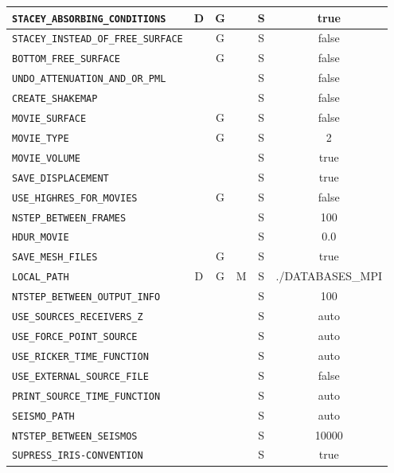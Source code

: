 \begin{longtable}{|p{7.7cm}|c|c|c|c|c|}
		\verb+STACEY_ABSORBING_CONDITIONS+   & D & G &   & S & true \\ \hline
		\verb+STACEY_INSTEAD_OF_FREE_SURFACE+&   & G &   & S & false \\ \hline
		\verb+BOTTOM_FREE_SURFACE+           &   & G &   & S & false \\ \hline
		\verb+UNDO_ATTENUATION_AND_OR_PML+   &   &   &   & S & false \\ \hline
		\verb+CREATE_SHAKEMAP+               &   &   &   & S & false \\ \hline
		\verb+MOVIE_SURFACE+                 &   & G &   & S & false \\ \hline
		\verb+MOVIE_TYPE+                    &   & G &   & S & 2 \\ \hline
		\verb+MOVIE_VOLUME+                  &   &   &   & S & true \\ \hline
		\verb+SAVE_DISPLACEMENT+             &   &   &   & S & true \\ \hline
		\verb+USE_HIGHRES_FOR_MOVIES+        &   & G &   & S & false \\ \hline
		\verb+NSTEP_BETWEEN_FRAMES+          &   &   &   & S & 100 \\ \hline
		\verb+HDUR_MOVIE+                    &   &   &   & S & 0.0 \\ \hline
		\verb+SAVE_MESH_FILES+               &   & G &   & S & true \\ \hline
		\verb+LOCAL_PATH+                    & D & G & M & S & ./DATABASES\_MPI \\ \hline
		\verb+NTSTEP_BETWEEN_OUTPUT_INFO+    &   &   &   & S & 100 \\ \hline
      \verb+USE_SOURCES_RECEIVERS_Z+       &   &   &   & S & auto \\ \hline
      \verb+USE_FORCE_POINT_SOURCE+        &   &   &   & S & auto \\ \hline
      \verb+USE_RICKER_TIME_FUNCTION+      &   &   &   & S & auto \\ \hline
      \verb+USE_EXTERNAL_SOURCE_FILE+      &   &   &   & S & false \\ \hline
      \verb+PRINT_SOURCE_TIME_FUNCTION+    &   &   &   & S & auto \\ \hline
      \verb+SEISMO_PATH+                   &   &   &   & S & auto \\ \hline
      \verb+NTSTEP_BETWEEN_SEISMOS+        &   &   &   & S & 10000 \\ \hline
      \verb+SUPRESS_IRIS-CONVENTION+       &   &   &   & S & true \\ \hline

\end{longtable}
